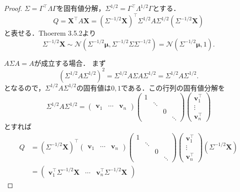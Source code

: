 \begin{proof}
  \(\Sigma = \Gamma^\top \Lambda \Gamma\)を固有値分解，\(\Sigma^{1/2} = \Gamma^\top \Lambda^{1/2} \Gamma\)とする．
  \[
  Q = \boldsymbol{X}^\top A \boldsymbol{X} = (\Sigma^{-1/2} \boldsymbol{X})^\top \Sigma^{1/2} A \Sigma^{1/2} (\Sigma^{-1/2} \boldsymbol{X})
  \]
  と表せる．Thoerem 3.5.2より
  \[
  \Sigma^{-1/2} \boldsymbol{X}
  \sim \mathcal{N}(\Sigma^{-1/2}\boldsymbol\mu, \Sigma^{-1/2}\Sigma\Sigma^{-1/2})
  = \mathcal{N}(\Sigma^{-1/2}\boldsymbol\mu, 1) .
  \]

  \(A\Sigma A = A\)が成立する場合．
  まず
  \[ (\Sigma^{1/2} A \Sigma^{1/2})^2 = \Sigma^{1/2} A \Sigma A \Sigma^{1/2} = \Sigma^{1/2} A \Sigma^{1/2} . \]
  となるので，\(\Sigma^{1/2} A \Sigma^{1/2}\)の固有値は\(0, 1\)である．この行列の固有値分解を
  \[
  \Sigma^{1/2} A \Sigma^{1/2} =
  \begin{pmatrix}
    \boldsymbol{v}_1 & \cdots & \boldsymbol{v}_n
  \end{pmatrix}
  \begin{pmatrix}
    1 & & & \\
    & \ddots & & \\
    & & 0 & \\
    & & & \ddots
  \end{pmatrix}
  \begin{pmatrix}
    \boldsymbol{v}_1^\top \\ \vdots \\ \boldsymbol{v}_n^\top
  \end{pmatrix}
  \]
  とすれば
  \begin{align*}
    Q &= (\Sigma^{-1/2} \boldsymbol{X})^\top
    \begin{pmatrix}
      \boldsymbol{v}_1 & \cdots & \boldsymbol{v}_n
    \end{pmatrix}
    \begin{pmatrix}
      1 & & & \\
      & \ddots & & \\
      & & 0 & \\
      & & & \ddots
    \end{pmatrix}
    \begin{pmatrix}
      \boldsymbol{v}_1^\top \\ \vdots \\ \boldsymbol{v}_n^\top
    \end{pmatrix}
    (\Sigma^{-1/2} \boldsymbol{X})
    \\
    &=
    \begin{pmatrix}
      \boldsymbol{v}_1^\top \Sigma^{-1/2} \boldsymbol{X} & \cdots & \boldsymbol{v}_n^\top \Sigma^{-1/2} \boldsymbol{X}

\end{pmatrix}
\end{align*}
\end{proof}
